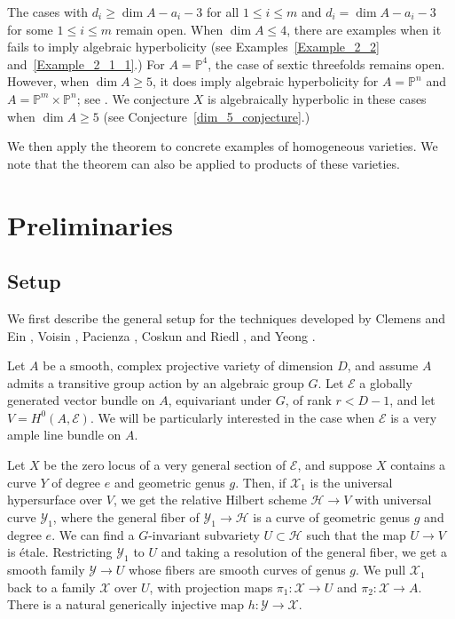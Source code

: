 \documentclass[10pt,a4paper]{article}
\numberwithin{equation}{section}
\theoremstyle{definition}
\theoremstyle{remark}
\renewcommand{\P}{\mathbb{P}}
\begin{document}
The cases with $d_i\ge \dim A - a_i - 3$ for all $1\le i\le m$ and $d_i = \dim A-a_i-3$ for some $1\le i\le m$ remain open. When $\dim A\le 4$, there are examples when it fails to imply algebraic hyperbolicity (see Examples~\ref{Example_2_2} and~\ref{Example_2_1_1}.) For $A=\P^4$, the case of sextic threefolds remains open. However, when $\dim A\ge 5$, it does imply algebraic hyperbolicity for $A=\P^n$ and $A=\P^m\times \P^n$; see \cite{Y22}. We conjecture $X$ is algebraically hyperbolic in these cases when $\dim A\ge 5$ (see Conjecture~\ref{dim_5_conjecture}.)

We then apply the theorem to concrete examples of homogeneous varieties. We note that the theorem can also be applied to products of these varieties.

\section{Preliminaries}\label{sec2}

\subsection{Setup}\label{setup}
We first describe the general setup for the techniques developed by Clemens and Ein \cite{Ei88, Ei91}, Voisin \cite{Vo96, Vo98}, Pacienza \cite{Pa03, Pa04}, Coskun and Riedl \cite{CR19a, CR19}, and Yeong \cite{Y22}.

Let $A$ be a smooth, complex projective variety of dimension $D$, and assume $A$ admits a transitive group action by an algebraic group $G$. Let $\mathcal{E}$ a globally generated vector bundle on $A$, equivariant under $G$, of rank $r<D-1$, and let $V = H^0(A,\mathcal{E})$. We will be particularly interested in the case when $\mathcal{E}$ is a very ample line bundle on $A$.

Let $X$ be the zero locus of a very general section of $\mathcal{E}$, and suppose $X$ contains a curve $Y$ of degree $e$ and geometric genus $g$. Then, if $\mathcal{X}_1$ is the universal hypersurface over $V$, we get the relative Hilbert scheme $\mathcal{H}\to V$ with universal curve $\mathcal{Y}_1$, where the general fiber of $\mathcal{Y}_1\to \mathcal{H}$ is a curve of geometric genus $g$ and degree $e$. We can find a $G$-invariant subvariety $U\subset \mathcal{H}$ such that the map $U\to V$ is \'etale. Restricting $\mathcal{Y}_1$ to $U$ and taking a resolution of the general fiber, we get a smooth family $\mathcal{Y}\to U$ whose fibers are smooth curves of genus $g$. We pull $\mathcal{X}_1$ back to a family $\mathcal{X}$ over $U$, with projection maps $\pi_1\colon \mathcal{X}\to U$ and $\pi_2\colon \mathcal{X}\to A$. There is a natural generically injective map $h\colon \mathcal{Y}\to \mathcal{X}$.
\end{document}
